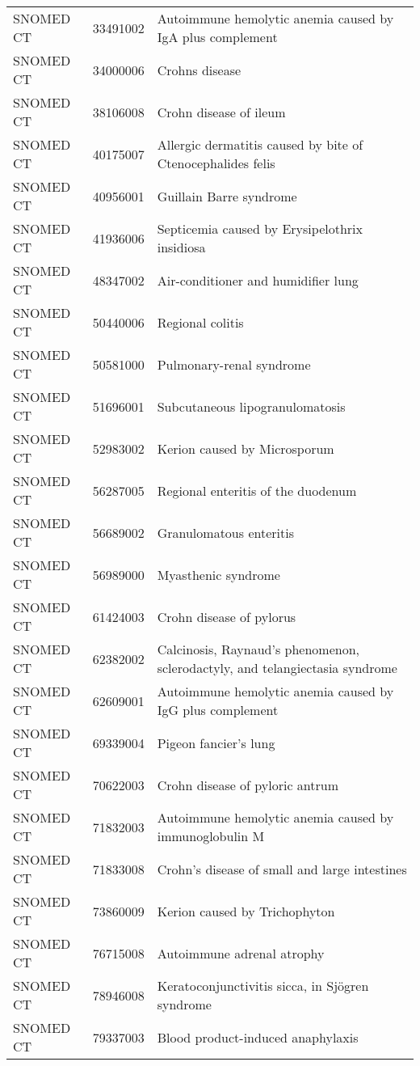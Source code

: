 \begin{longtable}{p{}p{}p{}}
  SNOMED CT & 33491002 & Autoimmune hemolytic anemia caused by IgA plus complement \\ 
  SNOMED CT & 34000006 & Crohns disease \\ 
  SNOMED CT & 38106008 & Crohn disease of ileum \\ 
  SNOMED CT & 40175007 & Allergic dermatitis caused by bite of Ctenocephalides felis \\ 
  SNOMED CT & 40956001 & Guillain Barre syndrome \\ 
  SNOMED CT & 41936006 & Septicemia caused by Erysipelothrix insidiosa \\ 
  SNOMED CT & 48347002 & Air-conditioner and humidifier lung \\ 
  SNOMED CT & 50440006 & Regional colitis \\ 
  SNOMED CT & 50581000 & Pulmonary-renal syndrome \\ 
  SNOMED CT & 51696001 & Subcutaneous lipogranulomatosis \\ 
  SNOMED CT & 52983002 & Kerion caused by Microsporum \\ 
  SNOMED CT & 56287005 & Regional enteritis of the duodenum \\ 
  SNOMED CT & 56689002 & Granulomatous enteritis \\ 
  SNOMED CT & 56989000 & Myasthenic syndrome \\ 
  SNOMED CT & 61424003 & Crohn disease of pylorus \\ 
  SNOMED CT & 62382002 & Calcinosis, Raynaud's phenomenon, sclerodactyly, and telangiectasia syndrome \\ 
  SNOMED CT & 62609001 & Autoimmune hemolytic anemia caused by IgG plus complement \\ 
  SNOMED CT & 69339004 & Pigeon fancier's lung \\ 
  SNOMED CT & 70622003 & Crohn disease of pyloric antrum \\ 
  SNOMED CT & 71832003 & Autoimmune hemolytic anemia caused by immunoglobulin M \\ 
  SNOMED CT & 71833008 & Crohn's disease of small and large intestines \\ 
  SNOMED CT & 73860009 & Kerion caused by Trichophyton \\ 
  SNOMED CT & 76715008 & Autoimmune adrenal atrophy \\ 
  SNOMED CT & 78946008 & Keratoconjunctivitis sicca, in Sjögren syndrome \\ 
  SNOMED CT & 79337003 & Blood product-induced anaphylaxis \\ 

\end{longtable}
